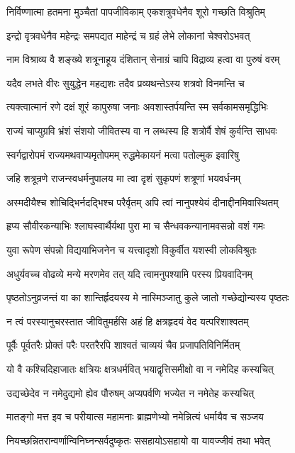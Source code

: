 \twolineshloka
{निर्विण्णात्मा हतमना मुञ्चैतां पापजीविकाम्}
{एकशत्रुवधेनैव शूरो गच्छति विश्रुतिम्}


\twolineshloka
{इन्द्रो वृत्रवधेनैव महेन्द्रः समपद्यत}
{माहेन्द्रं च ग्रहं लेभे लोकानां चेश्वरोऽभवत्}


\twolineshloka
{नाम विश्राव्य वै शङ्ख्ये शत्रूनाहूय दंशितान्}
{सेनाग्रं चापि विद्राव्य हत्वा वा पुरुषं वरम्}


\twolineshloka
{यदैव लभते वीरः सुयुद्धेन महद्यशः}
{तदैव प्रव्यथन्तेऽस्य शत्रवो विनमन्ति च}


\twolineshloka
{त्यक्त्वात्मानं रणे दक्षं शूरं कापुरुषा जनाः}
{अवशास्तर्पयन्ति स्म सर्वकामसमृद्धिभिः}


\twolineshloka
{राज्यं चाप्युग्रवि भ्रंशं संशयो जीवितस्य वा}
{न लब्धस्य हि शत्रोर्वै शेषं कुर्वन्ति साधवः}


\twolineshloka
{स्वर्गद्वारोपमं राज्यमथवाप्यमृतोपमम्}
{रुद्धमेकायनं मत्वा पतोल्मुक इवारिषु}


\twolineshloka
{जहि शत्रून्रणे राजन्स्वधर्मनुपालय}
{मा त्वा दृशं सुकृपणं शत्रूणां भयवर्धनम्}


\twolineshloka
{अस्मदीयैश्च शोचिद्भिर्नदद्भिश्च परैर्वृतम्}
{अपि त्वां नानुपश्येयं दीनाद्दीनमिवास्थितम्}


\twolineshloka
{हृप्य सौवीरकन्याभिः श्लाघस्वार्थैर्यथा पुरा}
{मा च सैन्धवकन्यानामवसन्नो वशं गमः}


\twolineshloka
{युवा रूपेण संपन्नो विद्ययाभिजनेन च}
{यत्त्वादृशो विकुर्वीत यशस्वी लोकविश्रुतः}


\twolineshloka
{अधुर्यवच्च वोढव्ये मन्ये मरणमेव तत्}
{यदि त्वामनुपश्यामि परस्य प्रियवादिनम्}


\threelineshloka
{पृष्ठतोऽनुव्रजन्तं वा का शान्तिर्हृदयस्य मे}
{नास्मिञ्जातु कुले जातो गच्छेद्योन्यस्य पृष्ठतः}
{}


\twolineshloka
{न त्वं परस्यानुचरस्तात जीवितुमर्हसि}
{अहं हि क्षत्रहृदयं वेद यत्परिशाश्वतम्}


\twolineshloka
{पूर्वैः पूर्वतरैः प्रोक्तं परैः परतरैरपि}
{शाश्वतं चाव्ययं चैव प्रजापतिविनिर्मितम्}


\twolineshloka
{यो वै कश्चिदिहाजातः क्षत्रियः क्षत्रधर्मवित्}
{भयाद्वृत्तिसमीक्षो वा न नमेदिह कस्यचित्}


\twolineshloka
{उद्यच्छेदेव न नमेदुद्यमो ह्येव पौरुषम्}
{अप्यपर्वणि भज्येत न नमेतेह कस्यचित्}


\twolineshloka
{मातङ्गो मत्त इव च परीयात्स महामनाः}
{ब्राह्मणेभ्यो नमेन्नित्यं धर्मायैव च सञ्जय}


\twolineshloka
{नियच्छन्नितरान्वर्णान्विनिघ्नन्सर्वदुष्कृतः}
{ससहायोऽसहायो वा यावज्जीवं तथा भवेत्}


